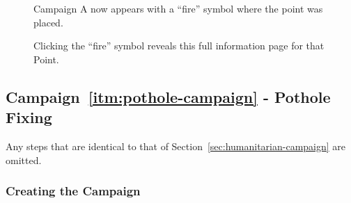 \documentclass{article}
\begin{document}
		\begin{figure}[H]
			\centering
			\caption{Campaign A now appears with a ``fire'' symbol where the point was placed.}
			\label{fig:eval-submita-3}
		\end{figure}

		\begin{figure}[H]
			\centering
			\caption{Clicking the ``fire'' symbol reveals this full information page for that Point.}
			\label{fig:eval-submita-4}
		\end{figure}

		\subsection{Campaign~\ref{itm:pothole-campaign} - Pothole Fixing}
		\label{sec:pothole-campaign}

		Any steps that are identical to that of Section~\ref{sec:humanitarian-campaign} are omitted.

		\subsubsection{Creating the Campaign}
\end{document}
